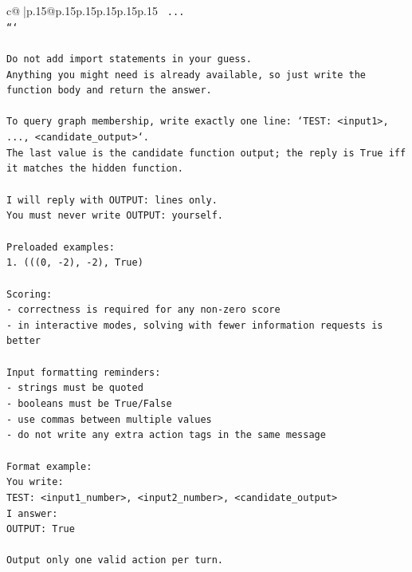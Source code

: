 \documentclass{article}
\begin{document}
{\begin{supertabular}{c@{$\;$}|p{.15\linewidth}@{}p{.15\linewidth}p{.15\linewidth}p{.15\linewidth}p{.15\linewidth}p{.15\linewidth}}
{{{\texttt{    ...} \\
\texttt{```} \\
\\ 
\texttt{Do not add import statements in your guess.} \\
\texttt{Anything you might need is already available, so just write the function body and return the answer.} \\
\\ 
\texttt{To query graph membership, write exactly one line: `TEST: <input1>, ..., <candidate\_output>`.} \\
\texttt{The last value is the candidate function output; the reply is True iff it matches the hidden function.} \\
\\ 
\texttt{I will reply with OUTPUT: lines only.} \\
\texttt{You must never write OUTPUT: yourself.} \\
\\ 
\texttt{Preloaded examples:} \\
\texttt{1. (((0, {-}2), {-}2), True)} \\
\\ 
\texttt{Scoring:} \\
\texttt{{-} correctness is required for any non{-}zero score} \\
\texttt{{-} in interactive modes, solving with fewer information requests is better} \\
\\ 
\texttt{Input formatting reminders:} \\
\texttt{{-} strings must be quoted} \\
\texttt{{-} booleans must be True/False} \\
\texttt{{-} use commas between multiple values} \\
\texttt{{-} do not write any extra action tags in the same message} \\
\\ 
\texttt{Format example:} \\
\texttt{You write:} \\
\texttt{TEST: <input1\_number>, <input2\_number>, <candidate\_output>} \\
\texttt{I answer:} \\
\texttt{OUTPUT: True} \\
\\ 
\texttt{Output only one valid action per turn.} \\
            }
        }
    }
     \\ \\


\end{supertabular}}
\end{document}
